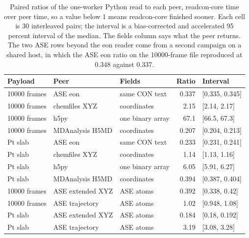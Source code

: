 \begin{table}[ht]
\centering
\small
\caption{Paired ratios of the one-worker Python read to each peer, readcon-core time over peer time, so a value below 1 means readcon-core finished sooner. Each cell is 30 interleaved pairs; the interval is a bias-corrected and accelerated 95 percent interval of the median. The fields column says what the peer returns. The two ASE rows beyond the eon reader come from a second campaign on a shared host, in which the ASE eon ratio on the 10000-frame file reproduced at 0.348 against 0.337.}
\label{tab:peers}
\footnotesize
\setlength{\tabcolsep}{4pt}
\begin{tabular}{lllrl}
\toprule
Payload & Peer & Fields & Ratio & Interval \\
\midrule
10000 frames & ASE eon & same CON text & 0.337 & [0.335, 0.345] \\
10000 frames & chemfiles XYZ & coordinates & 2.15 & [2.14, 2.17] \\
10000 frames & h5py & one binary array & 67.1 & [66.5, 67.3] \\
10000 frames & MDAnalysis H5MD & coordinates & 0.207 & [0.204, 0.213] \\
Pt slab & ASE eon & same CON text & 0.233 & [0.231, 0.241] \\
Pt slab & chemfiles XYZ & coordinates & 1.14 & [1.13, 1.16] \\
Pt slab & h5py & one binary array & 6.05 & [5.91, 6.27] \\
Pt slab & MDAnalysis H5MD & coordinates & 0.394 & [0.387, 0.404] \\
10000 frames & ASE extended XYZ & ASE atoms & 0.392 & [0.338, 0.42] \\
10000 frames & ASE trajectory & ASE atoms & 1.02 & [0.948, 1.08] \\
Pt slab & ASE extended XYZ & ASE atoms & 0.184 & [0.18, 0.192] \\
Pt slab & ASE trajectory & ASE atoms & 3.19 & [3.08, 3.28] \\
\bottomrule
\end{tabular}
\end{table}
